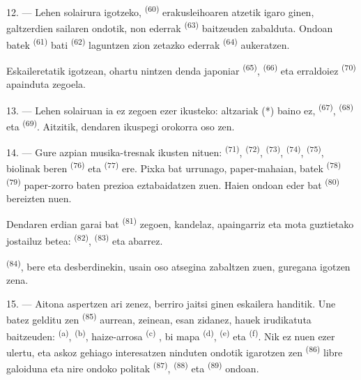 12. --- Lehen solairura igotzeko,  \textsuperscript{(60)}
erakusleihoaren atzetik igaro ginen, galtzerdien sailaren ondotik, non
 ederrak \textsuperscript{(63)} baitzeuden zabalduta. Ondoan
 batek \textsuperscript{(61)}  bati
\textsuperscript{(62)} laguntzen zion zetazko  ederrak
\textsuperscript{(64)} aukeratzen.

Eskaileretatik igotzean, ohartu nintzen denda japoniar 
\textsuperscript{(65)},  \textsuperscript{(66)} eta
 erraldoiez \textsuperscript{(70)} apainduta zegoela.

13. --- Lehen solairuan ia ez zegoen ezer ikusteko: altzariak (*) baino ez,
 \textsuperscript{(67)}, 
\textsuperscript{(68)} eta  \textsuperscript{(69)}. Aitzitik,
dendaren ikuspegi orokorra oso  zen.

14. --- Gure azpian musika-tresnak ikusten nituen: 
\textsuperscript{(71)},  \textsuperscript{(72)},
 \textsuperscript{(73)}, 
\textsuperscript{(74)},  \textsuperscript{(75)}, biolinak
beren  \textsuperscript{(76)} eta 
\textsuperscript{(77)} ere. Pixka bat urrunago, paper-mahaian, 
batek \textsuperscript{(78)}  \textsuperscript{(79)}
paper-zorro baten prezioa eztabaidatzen zuen. Haien ondoan 
eder bat \textsuperscript{(80)} bereizten nuen.

Dendaren erdian  garai bat \textsuperscript{(81)} zegoen,
kandelaz, apaingarriz eta mota guztietako jostailuz betea:  \textsuperscript{(82)},  \textsuperscript{(83)} eta
abarrez.

 \textsuperscript{(84)}, bere  eta
 desberdinekin, usain oso atsegina zabaltzen zuen, guregana
igotzen zena.

\VUsaut{3.4mm}
\VUsaut{2.8mm}

15. --- Aitona aspertzen ari zenez, berriro jaitsi ginen eskailera handitik. Une
batez gelditu zen  \textsuperscript{(85)} aurrean,
zeinean, esan zidanez, hauek irudikatuta baitzeuden: 
\textsuperscript{(a)}, 
\textsuperscript{(b)}, haize-arrosa 
\textsuperscript{(c)} , bi
 mapa \textsuperscript{(d)}, 
\textsuperscript{(e)} eta  \textsuperscript{(f)}. Nik ez
nuen ezer ulertu, eta askoz gehiago interesatzen ninduten ondotik igarotzen zen
 \textsuperscript{(86)} libre galoiduna eta nire ondoko
 politak \textsuperscript{(87)}, 
\textsuperscript{(88)} eta  \textsuperscript{(89)} ondoan.

